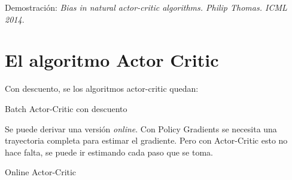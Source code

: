 Demostración: \textit{Bias in natural actor-critic algorithms. Philip Thomas. ICML 2014}.

\section{El algoritmo Actor Critic}%
\label{sec:el_algoritmo_actor_critic}

Con descuento, se los algoritmos actor-critic quedan:

\begin{algorithm}
    \caption{Batch Actor-Critic con descuento}
    \label{alg:actor-critic-batch-desc}
\end{algorithm}

Se puede derivar una versión \textit{online}. Con Policy Gradients se necesita una
trayectoria completa para estimar el gradiente. Pero con Actor-Critic esto no hace falta, se
puede ir estimando cada paso que se toma.

\begin{algorithm}
    \caption{Online Actor-Critic}
    \label{alg:cont-actor-critic}
\end{algorithm}

